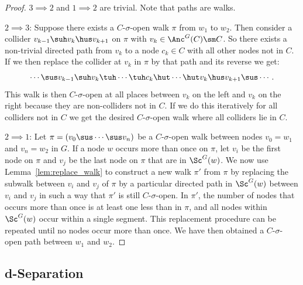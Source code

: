 \restateprpsigmaopens*
\begin{proof}
$3 \implies 2$ and $1 \implies 2$ are trivial. Note that paths are walks.

$2 \implies 3$: Suppose there exists a $C$-$\sigma$-open walk $\pi$ from $w_1$ to $w_2$.
Then consider a collider $v_{k-1} \suh v_k \hus v_{k+1}$ on $\pi$ with $v_k \in \Anc^G(C) \sm C$.
So there exists a non-trivial directed path from $v_k$ to a node $c_k \in C$ with all other nodes not in $C$.
If we then replace the collider at $v_k$ in $\pi$ by that path and its reverse we get:
\[ \cdots \sus v_{k-1} \suh v_k \tuh \cdots \tuh c_k \hut \cdots \hut v_k \hus v_{k+1} \sus \cdots.  \]
This walk is then $C$-$\sigma$-open at all places between $v_k$ on the left and $v_k$ on the right because they are non-colliders not in $C$. If we do this iteratively for all colliders not in $C$ we get the desired $C$-$\sigma$-open walk where all colliders lie in $C$.

$2 \implies 1$:
Let $\pi = (v_0 \sus \cdots \sus v_n)$ be a $C$-$\sigma$-open walk between nodes $v_0=w_1$ and $v_n=w_2$ in $G$. 
If a node $w$ occurs more than once on $\pi$, let $v_i$ be the first node on $\pi$ and $v_j$ be the last node on $\pi$ that are in $\Sc^G(w)$.
We now use Lemma~\ref{lem:replace_walk} to construct a new walk $\pi'$ from $\pi$ by replacing the subwalk between $v_i$ and $v_j$ of $\pi$ by a particular directed path in $\Sc^G(w)$ between $v_i$ and $v_j$ in such a way that $\pi'$ is still $C$-$\sigma$-open.
In $\pi'$, the number of nodes that occurs more than once is at least one less than in $\pi$, and all nodes within $\Sc^G(w)$ occur within a single segment.
This replacement procedure can be repeated until no nodes occur more than once. We have then obtained a
$C$-$\sigma$-open path between $w_1$ and $w_2$.
\end{proof}




\subsection{d-Separation}

